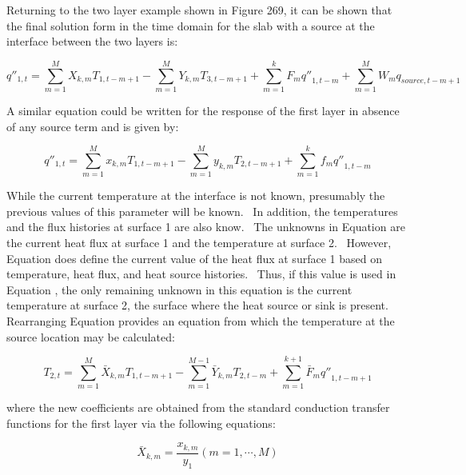Returning to the two layer example shown in Figure 269, it can be shown that the final solution form in the time domain for the slab with a source at the interface between the two layers is:

\begin{equation}
{q''_{1,t}} = \sum\limits_{m = 1}^M {{X_{k,m}}{T_{1,t - m + 1}}}  - \sum\limits_{m = 1}^M {{Y_{k,m}}{T_{3,t - m + 1}}}  + \sum\limits_{m = 1}^k {{F_m}{{q''}_{1,t - m}}}  + \sum\limits_{m = 1}^M {{W_m}{q_{source,t - m + 1}}}
\end{equation}

A similar equation could be written for the response of the first layer in absence of any source term and is given by:

\begin{equation}
{q''_{1,t}} = \sum\limits_{m = 1}^M {{x_{k,m}}{T_{1,t - m + 1}}}  - \sum\limits_{m = 1}^M {{y_{k,m}}{T_{2,t - m + 1}}}  + \sum\limits_{m = 1}^k {{f_m}{{q''}_{1,t - m}}}
\end{equation}

While the current temperature at the interface is not known, presumably the previous values of this parameter will be known.~ In addition, the temperatures and the flux histories at surface 1 are also know.~ The unknowns in Equation are the current heat flux at surface 1 and the temperature at surface 2.~ However, Equation does define the current value of the heat flux at surface 1 based on temperature, heat flux, and heat source histories.~ Thus, if this value is used in Equation , the only remaining unknown in this equation is the current temperature at surface 2, the surface where the heat source or sink is present.~ Rearranging Equation provides an equation from which the temperature at the source location may be calculated:

\begin{equation}
{T_{2,t}} = \sum\limits_{m = 1}^M {{{\bar X}_{k,m}}{T_{1,t - m + 1}}}  - \sum\limits_{m = 1}^{M - 1} {{{\bar Y}_{k,m}}{T_{2,t - m}}}  + \sum\limits_{m = 1}^{k + 1} {{{\bar F}_m}{{q''}_{1,t - m + 1}}}
\end{equation}

where the new coefficients are obtained from the standard conduction transfer functions for the first layer via the following equations:

\begin{equation}
{\bar X_{k,m}} = \frac{{{x_{k,m}}}}{{{y_1}}}\left( {m = 1, \cdots ,M} \right)
\end{equation}

